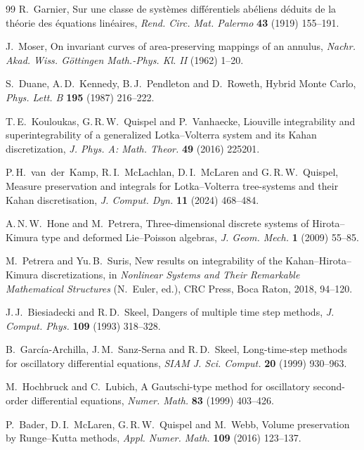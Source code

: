 \documentclass[11pt,a4paper]{article}
\theoremstyle{definition}
\theoremstyle{remark}
\begin{document}
\begin{thebibliography}{99}
 R.~Garnier, Sur une classe de syst\`emes diff\'erentiels ab\'eliens d\'eduits de la
th\'eorie des \'equations lin\'eaires, \emph{Rend. Circ. Mat. Palermo} \textbf{43} (1919) 155--191.

 J.~Moser, On invariant curves of area-preserving mappings of an annulus, \emph{Nachr. Akad.
Wiss. G\"ottingen Math.-Phys. Kl. II} (1962) 1--20.

 S.~Duane, A.\,D.~Kennedy, B.\,J.~Pendleton and D.~Roweth, Hybrid Monte Carlo, \emph{Phys.
Lett. B} \textbf{195} (1987) 216--222.

 T.\,E.~Kouloukas, G.\,R.\,W.~Quispel and P.~Vanhaecke, Liouville integrability and
superintegrability of a generalized Lotka--Volterra system and its Kahan discretization, \emph{J. Phys. A:
Math. Theor.} \textbf{49} (2016) 225201.

 P.\,H.~van~der~Kamp, R.\,I.~McLachlan, D.\,I.~McLaren and G.\,R.\,W.~Quispel, Measure
preservation and integrals for Lotka--Volterra tree-systems and their Kahan discretisation, \emph{J. Comput.
Dyn.} \textbf{11} (2024) 468--484.

 A.\,N.\,W.~Hone and M.~Petrera, Three-dimensional discrete systems of Hirota--Kimura
type and deformed Lie--Poisson algebras, \emph{J. Geom. Mech.} \textbf{1} (2009) 55--85.

 M.~Petrera and Yu.\,B.~Suris, New results on integrability of the Kahan--Hirota--Kimura
discretizations, in \emph{Nonlinear Systems and Their Remarkable Mathematical Structures} (N.~Euler, ed.), CRC
Press, Boca Raton, 2018, 94--120.

 J.\,J.~Biesiadecki and R.\,D.~Skeel, Dangers of multiple time step methods,
\emph{J. Comput. Phys.} \textbf{109} (1993) 318--328.

 B.~Garc\'ia-Archilla, J.\,M.~Sanz-Serna and R.\,D.~Skeel, Long-time-step methods for oscillatory
differential equations, \emph{SIAM J. Sci. Comput.} \textbf{20} (1999) 930--963.

 M.~Hochbruck and C.~Lubich, A Gautschi-type method for oscillatory second-order
differential equations, \emph{Numer. Math.} \textbf{83} (1999) 403--426.

 P.~Bader, D.\,I.~McLaren, G.\,R.\,W.~Quispel and M.~Webb, Volume preservation by Runge--Kutta
methods, \emph{Appl. Numer. Math.} \textbf{109} (2016) 123--137.

\end{thebibliography}
\end{document}
